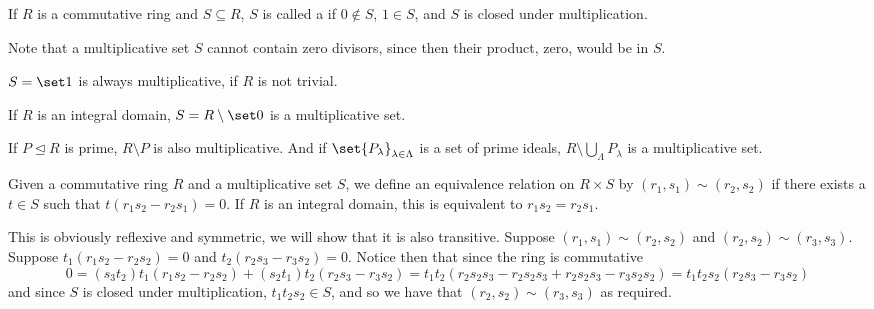 \documentclass[10pt]{article}
\let\ideal=\trianglelefteq
\begin{document}


\bigskip

\begin{defn*}

    If $R$ is a commutative ring and $S\subseteq R$, $S$ is called a  if $0\notin S$, $1\in S$, and $S$ is closed under multiplication.

\end{defn*}

Note that a multiplicative set $S$ cannot contain zero divisors, since then their product, zero, would be in $S$.

\begin{exam*}

    \benum
        \item $S=\set1$ is always multiplicative, if $R$ is not trivial.
        \item If $R$ is an integral domain, $S=R\setminus\set0$ is a multiplicative set.
        \item If $P\ideal R$ is prime, $R\setminus P$ is also multiplicative.
        And if $\set{P_\lambda}_{\lambda\in\Lambda}$ is a set of prime ideals, $R\setminus\bigcup_\Lambda P_\lambda$ is a multiplicative set.
    \eenum

\end{exam*}

Given a commutative ring $R$ and a multiplicative set $S$, we define an equivalence relation on $R\times S$ by $(r_1,s_1)\sim(r_2,s_2)$ if there exists a $t\in S$ such that $t(r_1s_2-r_2s_1)=0$.
If $R$ is an integral domain, this is equivalent to $r_1s_2=r_2s_1$.

This is obviously reflexive and symmetric, we will show that it is also transitive.
Suppose $(r_1,s_1)\sim(r_2,s_2)$ and $(r_2,s_2)\sim(r_3,s_3)$.
Suppose $t_1(r_1s_2-r_2s_2)=0$ and $t_2(r_2s_3-r_3s_2)=0$.
Notice then that since the ring is commutative
\[ 0 = (s_3t_2)t_1(r_1s_2-r_2s_2) + (s_2t_1)t_2(r_2s_3-r_3s_2) = t_1t_2(r_2s_2s_3 - r_2s_2s_3 + r_2s_2s_3 - r_3s_2s_2) = t_1t_2s_2(r_2s_3 - r_3s_2) \]
and since $S$ is closed under multiplication, $t_1t_2s_2\in S$, and so we have that $(r_2,s_2)\sim(r_3,s_3)$ as required.
\end{document}
